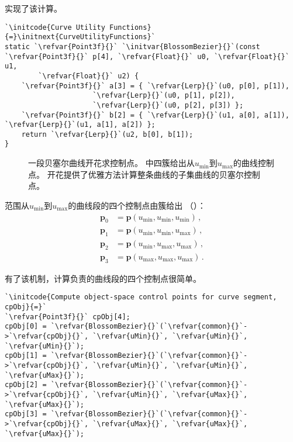 实现了该计算。
\begin{lstlisting}
`\initcode{Curve Utility Functions}{=}\initnext{CurveUtilityFunctions}`
static `\refvar{Point3f}{}` `\initvar{BlossomBezier}{}`(const `\refvar{Point3f}{}` p[4], `\refvar{Float}{}` u0, `\refvar{Float}{}` u1,
        `\refvar{Float}{}` u2) {
    `\refvar{Point3f}{}` a[3] = { `\refvar{Lerp}{}`(u0, p[0], p[1]),
                     `\refvar{Lerp}{}`(u0, p[1], p[2]),
                     `\refvar{Lerp}{}`(u0, p[2], p[3]) };
    `\refvar{Point3f}{}` b[2] = { `\refvar{Lerp}{}`(u1, a[0], a[1]), `\refvar{Lerp}{}`(u1, a[1], a[2]) };
    return `\refvar{Lerp}{}`(u2, b[0], b[1]);
}
\end{lstlisting}
\begin{figure}[htbp]
    \centering
    \caption{一段贝塞尔曲线开花求控制点。
        \protect{}中四簇给出从$u_{\min}$到$u_{\max}$的曲线控制点。
        开花提供了优雅方法计算整条曲线的子集曲线的贝塞尔控制点。}
    \label{fig:3.19}
\end{figure}

范围从$u_{\min}$到$u_{\max}$的曲线段的四个控制点由簇给出
（）：
\begin{align}\label{eq:3.5}
    \bm p_0 & =\bm p(u_{\min},u_{\min},u_{\min})\nonumber\, , \\
    \bm p_1 & =\bm p(u_{\min},u_{\min},u_{\max})\nonumber\, , \\
    \bm p_2 & =\bm p(u_{\min},u_{\max},u_{\max})\nonumber\, , \\
    \bm p_3 & =\bm p(u_{\max},u_{\max},u_{\max})\, .
\end{align}

有了该机制，计算负责的曲线段的四个控制点很简单。
\begin{lstlisting}
`\initcode{Compute object-space control points for curve segment, cpObj}{=}`
`\refvar{Point3f}{}` cpObj[4];
cpObj[0] = `\refvar{BlossomBezier}{}`(`\refvar{common}{}`->`\refvar{cpObj}{}`, `\refvar{uMin}{}`, `\refvar{uMin}{}`, `\refvar{uMin}{}`);
cpObj[1] = `\refvar{BlossomBezier}{}`(`\refvar{common}{}`->`\refvar{cpObj}{}`, `\refvar{uMin}{}`, `\refvar{uMin}{}`, `\refvar{uMax}{}`);
cpObj[2] = `\refvar{BlossomBezier}{}`(`\refvar{common}{}`->`\refvar{cpObj}{}`, `\refvar{uMin}{}`, `\refvar{uMax}{}`, `\refvar{uMax}{}`);
cpObj[3] = `\refvar{BlossomBezier}{}`(`\refvar{common}{}`->`\refvar{cpObj}{}`, `\refvar{uMax}{}`, `\refvar{uMax}{}`, `\refvar{uMax}{}`);
\end{lstlisting}

